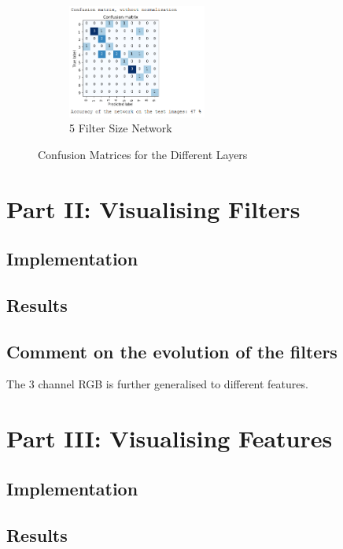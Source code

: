 \documentclass{report}
\begin{document}
\begin{figure}[h!]
\begin{subfigure}[t]{0.45\textwidth}
            \centering
            \includegraphics[width=0.5\textwidth]{5_ks}
            \caption{5 Filter Size Network}
        \end{subfigure}
        \caption{Confusion Matrices for the Different Layers}
    \end{figure}


    \section{Part II: Visualising Filters}

    \subsection{Implementation}

    \subsection{Results}

    \subsection{Comment on the evolution of the filters}

    The 3 channel RGB is further generalised to different features.

    \section{Part III: Visualising Features}
    
    \subsection{Implementation}

    \subsection{Results}
\end{document}
